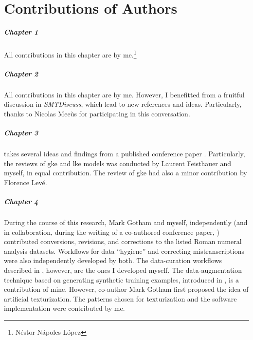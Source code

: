 \chapter*{Contributions of Authors}
\label{chap:contributionsofauthors}

\paragraph{Chapter 1}
All contributions in this chapter are by
me.\footnote{N\'estor N\'apoles L\'opez}

\paragraph{Chapter 2}
All contributions in this chapter are by me. However, I
benefitted from a fruitful discussion in
\emph{SMTDiscuss},
which lead to new references and ideas. Particularly, thanks
to Nicolas Mee\`us for participating in this conversation.

\paragraph{Chapter 3} 
 takes several ideas and findings
from a published conference paper
\parencite{napoleslopez2020local}. Particularly, the reviews
of \gls{gke} and \gls{lke} models was conducted by Laurent
Feisthauer and myself, in equal contribution. The review of
\gls{gke} had also a minor contribution by Florence Lev\'e.

\paragraph{Chapter 4} 
During the course of this research, Mark Gotham and myself,
independently (and in collaboration, during the writing of a
co-authored conference paper,
\cite{napoleslopez2021augmentednet}) contributed
conversions, revisions, and corrections to the listed Roman
numeral analysis datasets. Workflows for data ``hygiene''
and correcting mistranscriptions were also independently
developed by both. The data-curation workflows described in
, however, are the ones
I developed myself. The data-augmentation technique based on
generating synthetic training examples, introduced in
, is a
contribution of mine. However, co-author Mark Gotham first
proposed the idea of artificial texturization. The patterns
chosen for texturization and the software implementation
were contributed by me.

